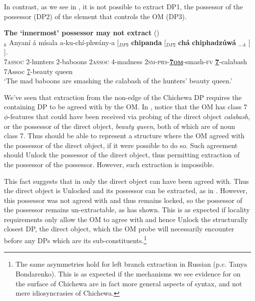 \documentclass[output=paper,colorlinks,citecolor=brown]{langscibook}
\begin{document}
In contrast, as we see in , it is not possible to extract DP1, the possessor of the possessor (DP2) of the element that controls the OM (DP3).

\ea%
    \label{ex:branan:16}
    \textbf{The `innermost' possessor may not extract} \hfill{(\citealt[61, ex. 32]{Mchombo2004})}\\
    $_{k}$  Anyaní á mísala a-ku-chí-phwány-a [$_{DP3}$ \textbf{chipanda}  [$_{DP2}$ \textbf{chá}  \textbf{chiphadz\'{u}w\'{a}} \_$_{k}$ ] ].  \\
            {} 7\textsc{assoc} 2-hunters   2-baboons 2\textsc{assoc} 4-madness 2\textsc{sm-prs}-\textbf{\underline{7\textsc{om}}}-smash-\textsc{fv} {} \textbf{\underline{7}}-calabash {} 7Assoc {\underline{7}-beauty queen} {} {} {}  \\
    \glt    `The mad baboons are smashing the calabash of the hunters’ beauty queen.'
\z

We've seen that extraction from the non-edge of the Chichewa DP requires the containing DP to be agreed with by the OM. In , notice that the OM has class 7 $\phi$-features that could have been received via probing of the direct object \textit{calabash}, or the possessor of the direct object, \textit{beauty queen}, both of which are of noun class 7. Thus  should be able to represent a structure where the OM agreed with the possessor of the direct object, if it were possible to do so. Such agreement should Unlock the possessor of the direct object, thus permitting extraction of the possessor of the possessor. However, such extraction is impossible.


This fact suggests that in  only the direct object can have been agreed with. Thus the direct object is Unlocked and its possessor can be extracted, as in . However, this possessor was not agreed with and thus remains locked, so the possessor of the possessor remains un-extractable, as  has shown. This is as expected if locality requirements only allow the OM to agree with and hence Unlock the structurally closest DP, the direct object, which the OM probe will necessarily encounter before any DPs which are its sub-constituents.\footnote{The same asymmetries hold for left branch extraction in Russian (p.c. Tanya Bondarenko). This is as expected if the mechanisms we see evidence for on the surface of Chichewa are in fact more general aspects of syntax, and not mere idiosyncrasies of Chichewa.}
\end{document}
